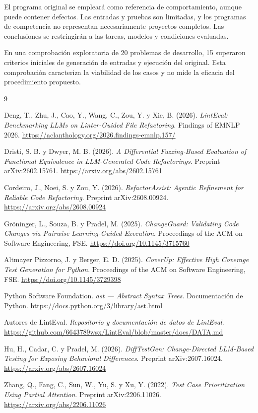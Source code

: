 \documentclass[11pt,openright,final]{unsa}
\begin{document}
El programa original se empleará como referencia de comportamiento, aunque puede contener defectos. Las entradas y pruebas son limitadas, y los programas de competencia no representan necesariamente proyectos completos. Las conclusiones se restringirán a las tareas, modelos y condiciones evaluadas.

En una comprobación exploratoria de 20 problemas de desarrollo, 15 superaron criterios iniciales de generación de entradas y ejecución del original. Esta comprobación caracteriza la viabilidad de los casos y no mide la eficacia del procedimiento propuesto.


\begin{thebibliography}{9}

 Deng, T., Zhu, J., Cao, Y., Wang, C., Zou, Y. y Xie, B. (2026). \emph{LintEval: Benchmarking LLMs on Linter-Guided File Refactoring}. Findings of EMNLP 2026. \url{https://aclanthology.org/2026.findings-emnlp.157/}

 Dristi, S. B. y Dwyer, M. B. (2026). \emph{A Differential Fuzzing-Based Evaluation of Functional Equivalence in LLM-Generated Code Refactorings}. Preprint arXiv:2602.15761. \url{https://arxiv.org/abs/2602.15761}

 Cordeiro, J., Noei, S. y Zou, Y. (2026). \emph{RefactorAssist: Agentic Refinement for Reliable Code Refactoring}. Preprint arXiv:2608.00924. \url{https://arxiv.org/abs/2608.00924}

 Gröninger, L., Souza, B. y Pradel, M. (2025). \emph{ChangeGuard: Validating Code Changes via Pairwise Learning-Guided Execution}. Proceedings of the ACM on Software Engineering, FSE. \url{https://doi.org/10.1145/3715760}

 Altmayer Pizzorno, J. y Berger, E. D. (2025). \emph{CoverUp: Effective High Coverage Test Generation for Python}. Proceedings of the ACM on Software Engineering, FSE. \url{https://doi.org/10.1145/3729398}

 Python Software Foundation. \emph{ast --- Abstract Syntax Trees}. Documentación de Python. \url{https://docs.python.org/3/library/ast.html}

 Autores de LintEval. \emph{Repositorio y documentación de datos de LintEval}. \url{https://github.com/6643789wsx/LintEval/blob/master/docs/DATA.md}

 Hu, H., Cadar, C. y Pradel, M. (2026). \emph{DiffTestGen: Change-Directed LLM-Based Testing for Exposing Behavioral Differences}. Preprint arXiv:2607.16024. \url{https://arxiv.org/abs/2607.16024}

 Zhang, Q., Fang, C., Sun, W., Yu, S. y Xu, Y. (2022). \emph{Test Case Prioritization Using Partial Attention}. Preprint arXiv:2206.11026. \url{https://arxiv.org/abs/2206.11026}
\end{thebibliography}
\end{document}
